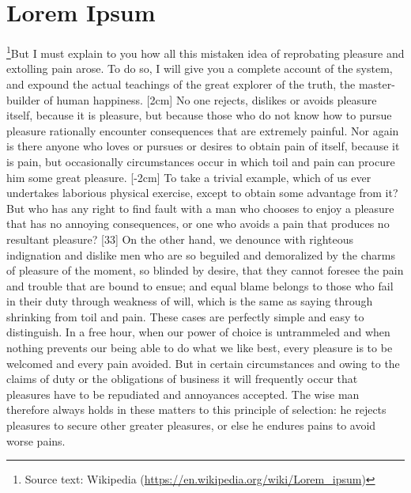 \documentclass{article}
\begin{document}
\section{Lorem Ipsum}
\footnote{Source text: Wikipedia (\url{https://en.wikipedia.org/wiki/Lorem_ipsum})}But I must explain to you how all this mistaken idea of reprobating pleasure and extolling pain arose. To do so, I will give you a complete account of the system, and expound the actual teachings of the great explorer of the truth, the master-builder of human happiness. [2cm] No one rejects, dislikes or avoids pleasure itself, because it is pleasure, but because those who do not know how to pursue pleasure rationally encounter consequences that are extremely painful. Nor again is there anyone who loves or pursues or desires to obtain pain of itself, because it is pain, but occasionally circumstances occur in which toil and pain can procure him some great pleasure. [-2cm] To take a trivial example, which of us ever undertakes laborious physical exercise, except to obtain some advantage from it? But who has any right to find fault with a man who chooses to enjoy a pleasure that has no annoying consequences, or one who avoids a pain that produces no resultant pleasure? [33] On the other hand, we denounce with righteous indignation and dislike men who are so beguiled and demoralized by the charms of pleasure of the moment, so blinded by desire, that they cannot foresee the pain and trouble that are bound to ensue; and equal blame belongs to those who fail in their duty through weakness of will, which is the same as saying through shrinking from toil and pain. These cases are perfectly simple and easy to distinguish. In a free hour, when our power of choice is untrammeled and when nothing prevents our being able to do what we like best, every pleasure is to be welcomed and every pain avoided. But in certain circumstances and owing to the claims of duty or the obligations of business it will frequently occur that pleasures have to be repudiated and annoyances accepted. The wise man therefore always holds in these matters to this principle of selection: he rejects pleasures to secure other greater pleasures, or else he endures pains to avoid worse pains.
\end{document}
